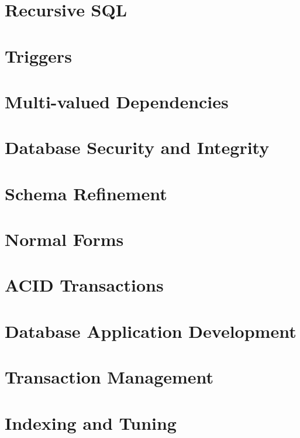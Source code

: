 \documentclass[12pt, letterpaper]{report}
\begin{document}
\part{Recursive SQL}

\part{Triggers}

\part{Multi-valued Dependencies}

\part{Database Security and Integrity}

\part{Schema Refinement}

\part{Normal Forms}

\part{ACID Transactions}

\part{Database Application Development}

\part{Transaction Management}

\part{Indexing and Tuning}
\end{document}
